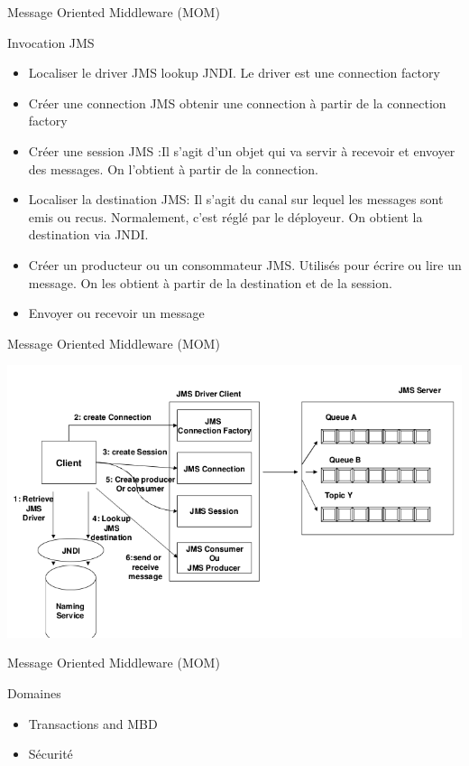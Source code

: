 {\begin{frame}{Message Oriented Middleware (MOM)}
  \end{frame}

  \begin{frame}
    \begin{block}{Invocation JMS}
      \begin{itemize}
        \item Localiser le driver JMS lookup JNDI. Le driver est une connection
factory
        \item Créer une connection JMS obtenir une connection à partir de la
connection factory
        \item Créer une session JMS :Il s'agit d'un objet qui va servir à recevoir et
envoyer des messages. On l'obtient à partir de la connection.
        \item Localiser la destination JMS: Il s'agit du canal sur lequel les
messages sont emis ou recus. Normalement, c'est réglé par le
déployeur. On obtient la destination via JNDI.
        \item Créer un producteur ou un consommateur JMS. Utilisés pour écrire
ou lire un message. On les obtient à partir de la destination et de la
session.
        \item Envoyer ou recevoir un message
      \end{itemize}
    \end{block}
  \end{frame}

  \begin{frame}{Message Oriented Middleware (MOM)}
    \begin{center}
      \includegraphics[scale=0.3]{img/jms-steps.png}
    \end{center}
  \end{frame}

  \begin{frame}{Message Oriented Middleware (MOM)}
    \begin{block}{Domaines}
      \begin{itemize}
        \item Transactions and MBD %
        \item Sécurité %
      \end{itemize}
    \end{block}
  \end{frame}

}
